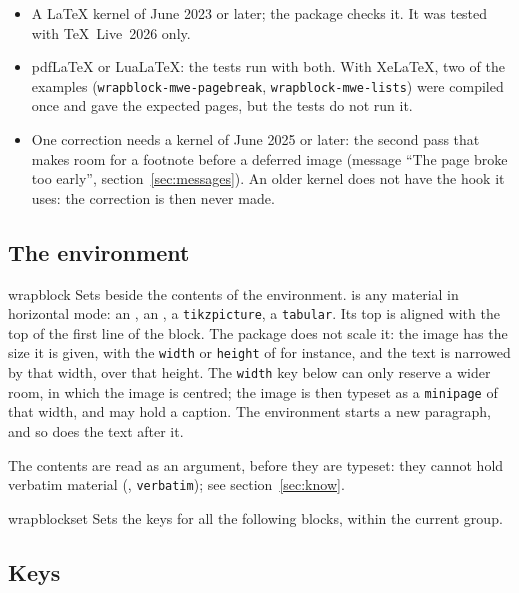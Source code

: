 \documentclass[a4paper,11pt]{article}
\newcommand\key[1]{\texttt{#1}}
\providecommand\env[1]{\texttt{#1}}
\begin{document}
\begin{itemize}
\item A \LaTeX{} kernel of June 2023 or later; the package checks it. It was tested with TeX~Live~2026 only.
\item pdf\LaTeX{} or Lua\LaTeX: the tests run with both. With Xe\LaTeX, two of the examples (\texttt{wrapblock-mwe-pagebreak}, \texttt{wrapblock-mwe-lists}) were compiled once and gave the expected pages, but the tests do not run it.
\item One correction needs a kernel of June 2025 or later: the second pass that makes room for a footnote before a deferred image (message ``The page broke too early'', section~\ref{sec:messages}). An older kernel does not have the hook it uses: the correction is then never made.
\end{itemize}

\subsection{The environment}

\begin{docEnvironment}{wrapblock}{}
  Sets  beside the contents of the environment.  is any material in horizontal mode: an , an , a \env{tikzpicture}, a \env{tabular}. Its top is aligned with the top of the first line of the block. The package does not scale it: the image has the size it is given, with the \key{width} or \key{height} of  for instance, and the text is narrowed by that width, over that height. The \key{width} key below can only reserve a wider room, in which the image is centred; the image is then typeset as a \env{minipage} of that width, and may hold a caption. The environment starts a new paragraph, and so does the text after it.

  The contents are read as an argument, before they are typeset: they cannot hold verbatim material (, \env{verbatim}); see section~\ref{sec:know}.
\end{docEnvironment}

\begin{docCommand}{wrapblockset}{}
  Sets the keys for all the following blocks, within the current group.
\end{docCommand}

\subsection{Keys}
\end{document}
